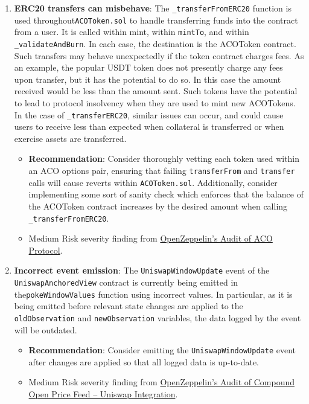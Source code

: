 \begin{enumerate}
\item\textbf{ERC20 transfers can misbehave}: The \verb|_transferFromERC20| function is used throughout\verb|ACOToken.sol| to handle transferring funds into the contract from a user. It is called within mint, within \verb|mintTo|, and within \verb|_validateAndBurn|. In each case, the destination is the ACOToken contract. Such transfers may behave unexpectedly if the token contract charges fees. As an example, the popular USDT token does not presently charge any fees upon transfer, but it has the potential to do so. In this case the amount received would be less than the amount sent. Such tokens have the potential to lead to protocol insolvency when they are used to mint new ACOTokens. In the case of \verb|_transferERC20|, similar issues can occur, and could cause users to receive less than expected when collateral is transferred or when exercise assets are transferred.
	\begin{itemize}
	\item\textbf{Recommendation}: Consider thoroughly vetting each token used within an ACO options pair, ensuring that failing \verb|transferFrom| and \verb|transfer| calls will cause reverts within \verb|ACOToken.sol|. Additionally, consider implementing some sort of sanity check which enforces that the balance of the ACOToken contract increases by the desired amount when calling \verb|_transferFromERC20|.
	\item Medium Risk severity finding from \href{https://blog.openzeppelin.com/aco-protocol-audit/}{OpenZeppelin’s Audit of ACO Protocol}.
	\end{itemize}

\item\textbf{Incorrect event emission}: The \verb|UniswapWindowUpdate| event of the \verb|UniswapAnchoredView| contract is currently being emitted in the\linebreak\verb|pokeWindowValues| function using incorrect values. In particular, as it is being emitted before relevant state changes are applied to the \verb|oldObservation| and \verb|newObservation| variables, the data logged by the event will be outdated.
	\begin{itemize}
	\item\textbf{Recommendation}: Consider emitting the \verb|UniswapWindowUpdate| event after changes are applied so that all logged data is up-to-date.
	\item Medium Risk severity finding from \href{https://blog.openzeppelin.com/compound-open-price-feed-uniswap-integration-audit/}{OpenZeppelin’s Audit of Compound Open Price Feed – Uniswap Integration}.
	\end{itemize}


\end{enumerate}
